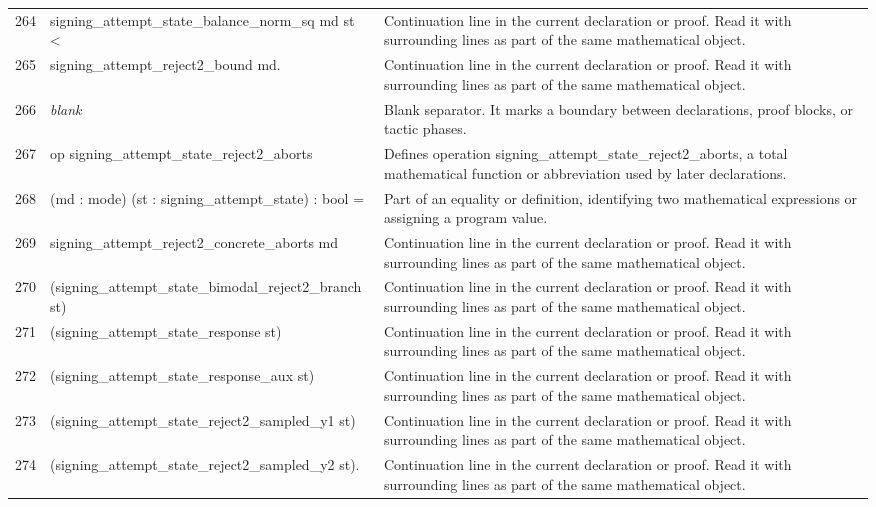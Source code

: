 \documentclass[10pt]{article}
\begin{document}
\begin{longtable}{r L{0.53\textwidth} L{0.37\textwidth}}
264 & {\ttfamily\scriptsize   signing\_attempt\_state\_balance\_norm\_sq md st <} & Continuation line in the current declaration or proof.  Read it with surrounding lines as part of the same mathematical object. \\
265 & {\ttfamily\scriptsize   signing\_attempt\_reject2\_bound md.} & Continuation line in the current declaration or proof.  Read it with surrounding lines as part of the same mathematical object. \\
266 & {\ttfamily\scriptsize \emph{blank}} & Blank separator.  It marks a boundary between declarations, proof blocks, or tactic phases. \\
267 & {\ttfamily\scriptsize op signing\_attempt\_state\_reject2\_aborts} & Defines operation signing\_attempt\_state\_reject2\_aborts, a total mathematical function or abbreviation used by later declarations. \\
268 & {\ttfamily\scriptsize    (md : mode) (st : signing\_attempt\_state) : bool =} & Part of an equality or definition, identifying two mathematical expressions or assigning a program value. \\
269 & {\ttfamily\scriptsize   signing\_attempt\_reject2\_concrete\_aborts md} & Continuation line in the current declaration or proof.  Read it with surrounding lines as part of the same mathematical object. \\
270 & {\ttfamily\scriptsize     (signing\_attempt\_state\_bimodal\_reject2\_branch st)} & Continuation line in the current declaration or proof.  Read it with surrounding lines as part of the same mathematical object. \\
271 & {\ttfamily\scriptsize     (signing\_attempt\_state\_response st)} & Continuation line in the current declaration or proof.  Read it with surrounding lines as part of the same mathematical object. \\
272 & {\ttfamily\scriptsize     (signing\_attempt\_state\_response\_aux st)} & Continuation line in the current declaration or proof.  Read it with surrounding lines as part of the same mathematical object. \\
273 & {\ttfamily\scriptsize     (signing\_attempt\_state\_reject2\_sampled\_y1 st)} & Continuation line in the current declaration or proof.  Read it with surrounding lines as part of the same mathematical object. \\
274 & {\ttfamily\scriptsize     (signing\_attempt\_state\_reject2\_sampled\_y2 st).} & Continuation line in the current declaration or proof.  Read it with surrounding lines as part of the same mathematical object. \\

\end{longtable}
\end{document}
